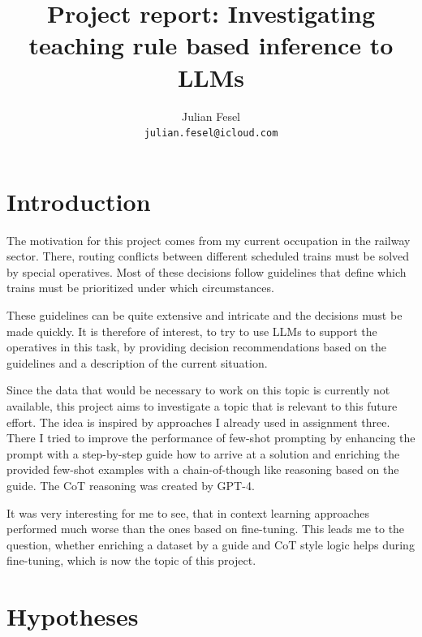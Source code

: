 \documentclass[11pt]{article}
\title{Project report: Investigating teaching rule based inference to LLMs}
\author{Julian Fesel \\
\texttt{julian.fesel@icloud.com}
}
\begin{document}
    \maketitle


    \section{Introduction}
    The motivation for this project comes from my current occupation in the railway sector.
    There, routing conflicts between different scheduled trains must be solved by special operatives.
    Most of these decisions follow guidelines that define which trains must be prioritized under which circumstances.

    These guidelines can be quite extensive and intricate and the decisions must be made quickly.
    It is therefore of interest, to try to use LLMs to support the operatives in this task, by providing decision
    recommendations based on the guidelines and a description of the current situation.

    Since the data that would be necessary to work on this topic is currently not available, this project aims to
    investigate a topic that is relevant to this future effort.
    The idea is inspired by approaches I already used in assignment three.
    There I tried to improve the performance of few-shot prompting by enhancing the prompt with a step-by-step guide
    how to arrive at a solution and enriching the provided few-shot examples with a chain-of-though like reasoning based
    on the guide.
    The CoT reasoning was created by GPT-4.

    It was very interesting for me to see, that in context learning approaches performed much worse than the ones based
    on fine-tuning.
    This leads me to the question, whether enriching a dataset by a guide and CoT style logic helps during fine-tuning,
    which is now the topic of this project.


    \section{Hypotheses}\label{S:hypothesis}
\end{document}
